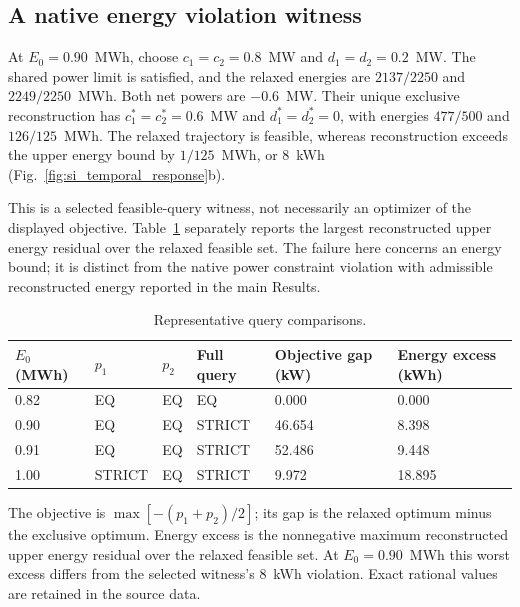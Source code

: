 \subsection{A native energy violation witness}
\label{si:temporal_witness}
At $E_0=0.90$~MWh, choose $c_1=c_2=0.8$~MW and $d_1=d_2=0.2$~MW. The shared power limit is satisfied, and the relaxed energies are $2137/2250$ and $2249/2250$~MWh. Both net powers are $-0.6$~MW. Their unique exclusive reconstruction has $c_1^*=c_2^*=0.6$~MW and $d_1^*=d_2^*=0$, with energies $477/500$ and $126/125$~MWh. The relaxed trajectory is feasible, whereas reconstruction exceeds the upper energy bound by $1/125$~MWh, or $8$~kWh (Fig.~\ref{fig:si_temporal_response}b).


This is a selected feasible-query witness, not necessarily an optimizer of the displayed objective. Table~\ref{tab:si_temporal_values} separately reports the largest reconstructed upper energy residual over the relaxed feasible set. The failure here concerns an energy bound; it is distinct from the native power constraint violation with admissible reconstructed energy reported in the main Results.

\begin{table}[t]

\caption{Representative query comparisons.}
\label{tab:si_temporal_values}


\begin{tabularx}{\linewidth}{@{}l l l l X X@{}}
\toprule
$E_0$ (MWh) & $p_1$ & $p_2$ & Full query & Objective gap (kW) & Energy excess (kWh) \\
\midrule
0.82 & EQ & EQ & EQ & 0.000 & 0.000 \\
0.90 & EQ & EQ & STRICT & 46.654 & 8.398 \\
0.91 & EQ & EQ & STRICT & 52.486 & 9.448 \\
1.00 & STRICT & EQ & STRICT & 9.972 & 18.895 \\
\bottomrule
\end{tabularx}
\par\smallskip
\begin{minipage}{\linewidth}
The objective is $\max[-(p_1+p_2)/2]$; its gap is the relaxed optimum minus the exclusive optimum. Energy excess is the nonnegative maximum reconstructed upper energy residual over the relaxed feasible set. At $E_0=0.90$~MWh this worst excess differs from the selected witness's $8$~kWh violation. Exact rational values are retained in the source data.
\end{minipage}
\end{table}



